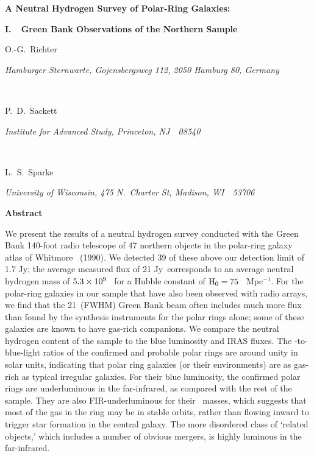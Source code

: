 %
\begin{flushleft}
\large
\centerline {\bf A Neutral Hydrogen Survey of Polar-Ring Galaxies:}
\vspace{0.1in}
\centerline {\bf I.~~Green Bank Observations of the Northern Sample}

\vspace{.75cm}

\normalsize
\centerline {O.-G.~Richter}
\centerline {\it  Hamburger Sternwarte, Gojensbergsweg 112, 2050 Hamburg 80, 
Germany}

~
~
\centerline {P.\ D.~Sackett}
\centerline {\it  Institute for Advanced Study, Princeton, NJ~~08540}

~
~
\centerline {L.\ S.~Sparke}
\centerline {\it  University of Wisconsin, 475 N.~Charter St, 
Madison, WI~~53706}

\vspace{1.0in}
\normalbaselineskip

\end{flushleft}

\large
\centerline{\bf Abstract}
\normalsize
\medskip

We present the results of a neutral hydrogen survey 
conducted with the Green Bank 140-foot radio telescope 
of 47 northern objects in the polar-ring galaxy atlas of Whitmore \etal\ 
(1990). 
We detected 39 of these above our 
detection limit of 1.7 \hbox{Jy\CDOT\KMS}; the average measured flux of  
21 Jy\CDOT\KMS\ corresponds to an average neutral 
hydrogen mass of $\rm 5.3 \times 10^9$ \MSUN\ for 
a Hubble constant of $\rm H_0 = 75$ \KMS \ Mpc$^{-1}$.
For the polar-ring galaxies in our sample that have also been observed
with radio arrays, we find that the 21\AMIN\ (FWHM) Green Bank beam often
includes much more flux than found by the synthesis instruments for the polar
rings alone; some of these galaxies are known to have gas-rich companions.
We compare the neutral hydrogen content of the sample to the blue 
luminosity and IRAS fluxes.  The \HI-to-blue-light ratios of the 
confirmed and probable polar rings are around unity in solar units, 
indicating that polar ring galaxies (or their environments) are as gas-rich 
as typical irregular galaxies. 
For their blue luminosity, the confirmed polar rings are underluminous in the
far-infrared, as compared with the rest of the sample.
They are also FIR-underluminous for their \HI\ masses, which suggests that 
most of 
the gas in the ring may be in stable orbits, rather than flowing inward to
trigger star formation in the central galaxy.  
The more disordered class of `related objects,' 
which includes a number of obvious mergers, is highly luminous in the 
far-infrared.

